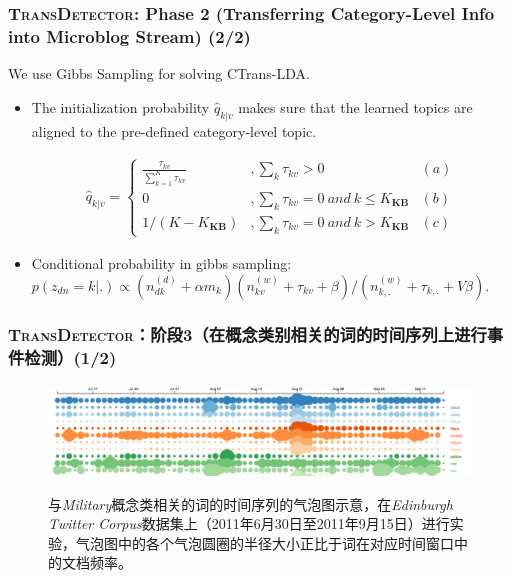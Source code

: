 \begin{frame}
\frametitle{\textsc{TransDetector}: Phase 2 (Transferring Category-Level Info into Microblog Stream) (2/2)}	
We use Gibbs Sampling for solving CTrans-LDA.
\begin{itemize}
	\item The initialization probability \(\hat{q}_{k|v}\) makes sure that the learned topics are aligned to the pre-defined category-level topic.
\setlength{\abovedisplayskip}{0pt}
\setlength{\belowdisplayskip}{0pt}
\begin{scriptsize} 
\begin{equation}
\label{eq:initProbability}
\begin{aligned}
\hat{q}_{k|v}=
\left\{ \begin{aligned}
\frac{\tau_{kv}}{\sum_{k=1}^{K}\tau_{kv}} &,\sum_{k}\tau_{kv}>0 & (a)\\
0&, \sum_{k}\tau_{kv}=0 \ and \ k \leq K_{\bm{KB}} & (b)\\
1/(K-K_{\bm{KB}})&,\sum_{k}\tau_{kv}=0 \ and \ k > K_{\bm{KB}} & (c)
\end{aligned}\right.
\end{aligned}
\end{equation}
\end{scriptsize}
\item Conditional probability in gibbs sampling:
\(p(z_{dn}=k|.)\propto (n^{(d)}_{dk}+\alpha m_k)(n^{(w)}_{kv}+\tau_{kv}+\beta)/(n^{(w)}_{k,.}+\tau_{k,.}+V\beta)\).
\end{itemize}
\end{frame}


\begin{frame}
\frametitle{\textsc{TransDetector}：阶段3（在概念类别相关的词的时间序列上进行事件检测）(1/2)}	
\begin{figure}[h]
		\setlength{\abovecaptionskip}{0.cm}
        \setlength{\belowcaptionskip}{0.cm}
        \centering
        \caption{与\textit{Military}概念类相关的词的时间序列的气泡图示意，在\textit{Edinburgh Twitter Corpus}数据集上（2011年6月30日至2011年9月15日）进行实验，气泡图中的各个气泡圆圈的半径大小正比于词在对应时间窗口中的文档频率。}
        \includegraphics[width=.99\columnwidth]{img/screenShot.png}
        \label{fig:hood}
\end{figure}
\end{frame}

